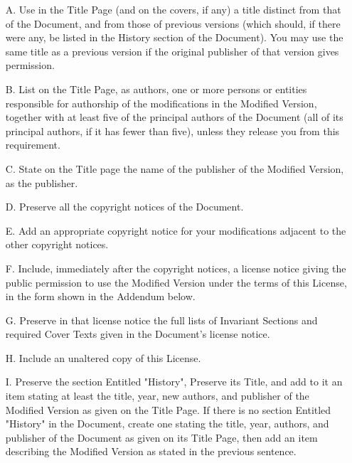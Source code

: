 \documentclass[a4paper,11pt]{article}
\begin{document}
\begin{itemize}
\item[A.] 
   Use in the Title Page (and on the covers, if any) a title distinct
   from that of the Document, and from those of previous versions
   (which should, if there were any, be listed in the History section
   of the Document).  You may use the same title as a previous version
   if the original publisher of that version gives permission.
   
\item[B.]
   List on the Title Page, as authors, one or more persons or entities
   responsible for authorship of the modifications in the Modified
   Version, together with at least five of the principal authors of the
   Document (all of its principal authors, if it has fewer than five),
   unless they release you from this requirement.
   
\item[C.]
   State on the Title page the name of the publisher of the
   Modified Version, as the publisher.
   
\item[D.]
   Preserve all the copyright notices of the Document.
   
\item[E.]
   Add an appropriate copyright notice for your modifications
   adjacent to the other copyright notices.
   
\item[F.]
   Include, immediately after the copyright notices, a license notice
   giving the public permission to use the Modified Version under the
   terms of this License, in the form shown in the Addendum below.
   
\item[G.]
   Preserve in that license notice the full lists of Invariant Sections
   and required Cover Texts given in the Document's license notice.
   
\item[H.]
   Include an unaltered copy of this License.
   
\item[I.]
   Preserve the section Entitled "History", Preserve its Title, and add
   to it an item stating at least the title, year, new authors, and
   publisher of the Modified Version as given on the Title Page.  If
   there is no section Entitled "History" in the Document, create one
   stating the title, year, authors, and publisher of the Document as
   given on its Title Page, then add an item describing the Modified
   Version as stated in the previous sentence.
   

\end{itemize}
\end{document}
